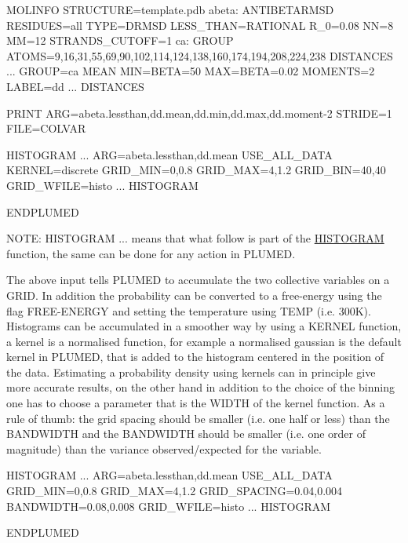 \begin{DoxyVerb}MOLINFO STRUCTURE=template.pdb
abeta: ANTIBETARMSD RESIDUES=all TYPE=DRMSD LESS_THAN={RATIONAL R_0=0.08 NN=8 MM=12} STRANDS_CUTOFF=1
ca: GROUP ATOMS=9,16,31,55,69,90,102,114,124,138,160,174,194,208,224,238
DISTANCES ...
GROUP=ca MEAN MIN={BETA=50} MAX={BETA=0.02} MOMENTS=2 LABEL=dd
... DISTANCES 

PRINT ARG=abeta.lessthan,dd.mean,dd.min,dd.max,dd.moment-2 STRIDE=1 FILE=COLVAR 

HISTOGRAM ...
ARG=abeta.lessthan,dd.mean
USE_ALL_DATA
KERNEL=discrete
GRID_MIN=0,0.8
GRID_MAX=4,1.2
GRID_BIN=40,40
GRID_WFILE=histo
... HISTOGRAM

ENDPLUMED
\end{DoxyVerb}


N\+O\+T\+E\+: H\+I\+S\+T\+O\+G\+R\+A\+M ... means that what follow is part of the \hyperlink{HISTOGRAM}{H\+I\+S\+T\+O\+G\+R\+A\+M} function, the same can be done for any action in P\+L\+U\+M\+E\+D.

The above input tells P\+L\+U\+M\+E\+D to accumulate the two collective variables on a G\+R\+I\+D. In addition the probability can be converted to a free-\/energy using the flag F\+R\+E\+E-\/\+E\+N\+E\+R\+G\+Y and setting the temperature using T\+E\+M\+P (i.\+e. 300\+K). Histograms can be accumulated in a smoother way by using a K\+E\+R\+N\+E\+L function, a kernel is a normalised function, for example a normalised gaussian is the default kernel in P\+L\+U\+M\+E\+D, that is added to the histogram centered in the position of the data. Estimating a probability density using kernels can in principle give more accurate results, on the other hand in addition to the choice of the binning one has to choose a parameter that is the W\+I\+D\+T\+H of the kernel function. As a rule of thumb\+: the grid spacing should be smaller (i.\+e. one half or less) than the B\+A\+N\+D\+W\+I\+D\+T\+H and the B\+A\+N\+D\+W\+I\+D\+T\+H should be smaller (i.\+e. one order of magnitude) than the variance observed/expected for the variable.

\begin{DoxyVerb}HISTOGRAM ...
ARG=abeta.lessthan,dd.mean
USE_ALL_DATA
GRID_MIN=0,0.8
GRID_MAX=4,1.2
GRID_SPACING=0.04,0.004
BANDWIDTH=0.08,0.008
GRID_WFILE=histo
... HISTOGRAM

ENDPLUMED
\end{DoxyVerb}


